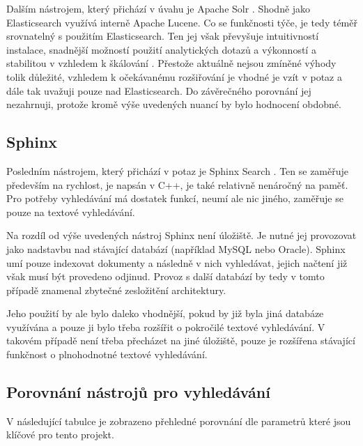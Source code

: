 \documentclass[FM,DP]{tulthesis}
\begin{document}
Dalším nástrojem, který přichází v úvahu je Apache Solr \cite{solr}. Shodně jako Elasticsearch 
využívá interně Apache Lucene. Co se funkčnosti týče, je tedy téměř srovnatelný s použitím
Elasticsearch. Ten jej však převyšuje intuitivností instalace, snadnější možností použití 
analytických dotazů a výkonností a stabilitou v vzhledem k škálování \cite{es-solr}. Přestože 
aktuálně nejsou zmíněné výhody tolik důležité, vzhledem k očekávanému rozšiřování je vhodné 
je vzít v potaz a dále tak uvažuji pouze nad Elasticsearch. Do závěrečného porovnání jej
nezahrnuji, protože kromě výše uvedených nuancí by bylo hodnocení obdobné.

\subsection{Sphinx}

Posledním nástrojem, který přichází v potaz je Sphinx Search \cite{sphinx}. Ten se zaměřuje 
především na rychlost, je napsán v C++, je také relativně nenáročný na paměť. 
Pro potřeby vyhledávání má dostatek funkcí, neumí ale nic jiného, zaměřuje se
pouze na textové vyhledávání.

Na rozdíl od výše uvedených nástroj Sphinx není úložiště. Je nutné jej provozovat
jako nadstavbu nad stávající databází (například MySQL nebo Oracle). Sphinx umí pouze 
indexovat dokumenty a následně v nich vyhledávat, jejich načtení již však musí být provedeno 
odjinud. Provoz s další databází by tedy v tomto případě znamenal zbytečné zesložitění architektury. 

Jeho použití by ale bylo daleko vhodnější, pokud by již byla jiná databáze využívána a pouze 
ji bylo třeba rozšířit o pokročilé textové vyhledávání. V takovém případě není třeba
přecházet na jiné úložiště, pouze je rozšířena stávající funkčnost o plnohodnotné
textové vyhledávání.

\subsection{Porovnání nástrojů pro vyhledávání}

V následující tabulce je zobrazeno přehledné porovnání dle parametrů které jsou klíčové pro 
tento projekt. 
\end{document}
